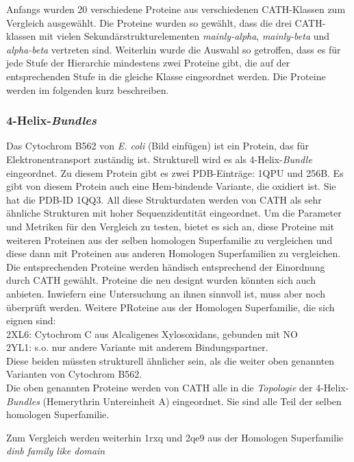 \documentclass{report}
\begin{document}
Anfangs wurden 20 verschiedene Proteine aus verschiedenen CATH-Klassen zum Vergleich ausgew\"ahlt. Die Proteine wurden so gew\"ahlt, dass die drei CATH-klassen mit vielen Sekund\"arstrukturelementen \textit{mainly-alpha}, \textit{mainly-beta} und \textit{alpha-beta} vertreten sind. Weiterhin wurde die Auswahl so getroffen, dass es f\"ur jede Stufe der Hierarchie mindestens zwei Proteine gibt, die auf der entsprechenden Stufe in die gleiche Klasse eingeordnet werden. Die Proteine werden im folgenden kurz beschreiben.


\subsubsection{4-Helix-\textit{Bundles}}

Das Cytochrom B562 von \emph{E. coli} (Bild einf\"ugen) ist ein Protein, das f\"ur Elektronentransport zust\"andig ist. Strukturell wird es als 4-Helix-\textit{Bundle} eingeordnet. Zu diesem Protein gibt es zwei PDB-Eintr\"age: 1QPU und 256B. Es gibt von diesem Protein auch eine Hem-bindende Variante, die oxidiert ist. Sie hat die PDB-ID 1QQ3. All diese Strukturdaten werden von CATH als sehr \"ahnliche Strukturen mit hoher Sequenzidentit\"at eingeordnet.
Um die Parameter und Metriken f\"ur den Vergleich zu testen, bietet es sich an, diese Proteine mit weiteren Proteinen aus der selben homologen Superfamilie zu vergleichen und diese dann mit Proteinen aus anderen Homologen Superfamilien zu vergleichen. Die entsprechenden Proteine werden h\"andisch entsprechend der Einordnung durch CATH gew\"ahlt. Proteine die neu designt wurden k\"onnten sich auch anbieten. Inwiefern eine Untersuchung an ihnen sinnvoll ist, muss aber noch \"uberpr\"uft werden.
Weitere PRoteine aus der Homologen Superfamilie, die sich eignen sind:\\
2XL6: Cytochrom C aus Alcaligenes Xylosoxidans, gebunden mit NO\\
2YL1: s.o. nur andere Variante mit anderem Bindungspartner.\\
Diese beiden m\"ussten strukturell \"ahnlicher sein, als die weiter oben genannten Varianten von Cytochrom B562.\\
Die oben genannten Proteine werden von CATH alle in die \emph{Topologie} der 4-Helix-\textit{Bundles} (Hemerythrin Untereinheit A) eingeordnet. Sie sind alle Teil der selben homologen Superfamilie.

Zum Vergleich werden weiterhin 1rxq und 2qe9 aus der Homologen Superfamilie \textit{dinb family like domain}  
\end{document}
